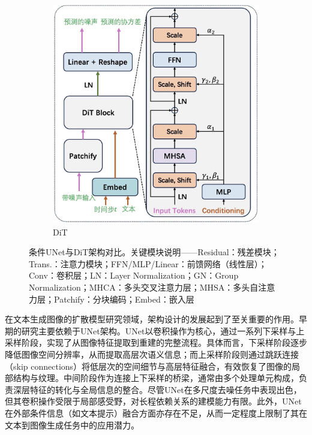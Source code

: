 \documentclass[11pt,a4paper,UTF8]{ctexart}
\begin{document}
\begin{figure}[htbp]
\begin{subfigure}[b]{0.52\textwidth}
        \includegraphics[width=\linewidth]{img/DiT.jpg}
        \caption{DiT}
        \label{fig:dit}
    \end{subfigure}
    \caption{条件UNet与DiT架构对比。关键模块说明——Residual：残差模块；Trans.：注意力模块；FFN/MLP/Linear：前馈网络（线性层）；Conv：卷积层；LN：Layer Normalization；GN：Group Normalization；MHCA：多头交叉注意力层；MHSA：多头自注意力层；Patchify：分块编码；Embed：嵌入层}
    \label{fig:cunet-dit}
\end{figure}

在文本生成图像的扩散模型研究领域，架构设计的发展起到了至关重要的作用。早期的研究\cite{song2019generative,ho2020denoising}主要依赖于UNet架构\cite{ronneberger2015u}。UNet以卷积操作为核心，通过一系列下采样与上采样阶段，实现了从图像特征提取到重建的完整流程。具体而言，下采样阶段逐步降低图像空间分辨率，从而提取高层次语义信息；而上采样阶段则通过跳跃连接（skip connections）将低层次的空间细节与高层特征融合，有效恢复了图像的局部结构与纹理。中间阶段作为连接上下采样的桥梁，通常由多个处理单元构成，负责深层特征的转化与全局信息的整合。尽管UNet在多尺度去噪任务中表现出色，但其卷积操作受限于局部感受野，对长程依赖关系的建模能力有限。此外，UNet在外部条件信息（如文本提示）融合方面亦存在不足，从而一定程度上限制了其在文本到图像生成任务中的应用潜力。
\end{document}
